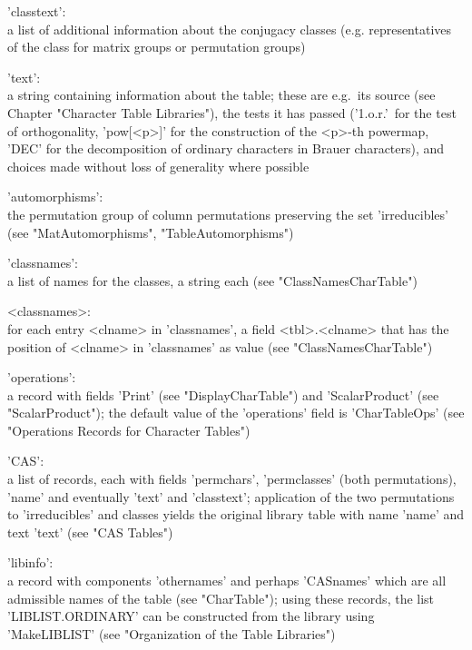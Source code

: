 'classtext':\\ a list of additional information about the conjugacy
               classes (e.g. representatives of the class for matrix
               groups or permutation groups)

'text':\\ a string containing information about the table; these are
          e.g.\ its source (see Chapter "Character Table Libraries"),
          the tests it has passed ('1.o.r.'\ for the test of
          orthogonality, 'pow[<p>]' for the construction of the <p>-th
          powermap, 'DEC' for the decomposition of ordinary characters in
          Brauer characters),
          and choices made without loss of generality where possible

'automorphisms':\\ the permutation group of column permutations
                   preserving the set 'irreducibles'
                   (see "MatAutomorphisms", "TableAutomorphisms")

'classnames':\\ a list of names for the classes, a string each
                (see "ClassNamesCharTable")

<classnames>:\\ for each entry <clname> in 'classnames', a field
                <tbl>.<clname> that has the position of <clname> in
                'classnames' as value (see "ClassNamesCharTable")

'operations':\\ a record with fields 'Print' (see "DisplayCharTable") and
                'ScalarProduct' (see "ScalarProduct"); the default value
                of the 'operations' field is 'CharTableOps'
                (see "Operations Records for Character Tables")

'CAS':\\ a list of records, each with fields 'permchars', 'permclasses'
         (both permutations), 'name' and eventually 'text' and
         'classtext'; application of the two permutations to
         'irreducibles' and classes yields the original {\CAS} library
         table with name 'name' and text 'text' (see "CAS Tables")

'libinfo':\\ a record with components 'othernames' and perhaps 'CASnames'
             which are all admissible names of the table (see
             "CharTable");
             using these records, the list 'LIBLIST.ORDINARY' can be
             constructed from the library using 'MakeLIBLIST'
             (see "Organization of the Table Libraries")

